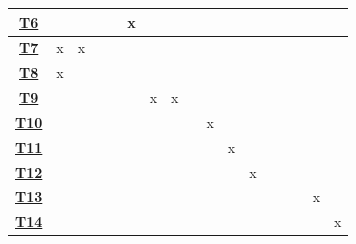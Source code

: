 \begin{table}[H]
\begin{tabular}{|c|c|c|c|c|c|c|c|c|c|c|c|c|c|c|c|c|}
	\hyperref[threat:T6]{\textbf{T6}}              &             &             &             &             & x           &    &    &    &    &     &     &     &     &     &     &     \\ \hline
	\hyperref[threat:T7]{\textbf{T7}}              & x           & x           &             &             &             &    &    &    &    &     &     &     &     &     &     &     \\ \hline
	\hyperref[threat:T8]{\textbf{T8}}              & x           &             &             &             &             &    &    &    &    &     &     &     &     &     &     &     \\ \hline
	\hyperref[threat:T9]{\textbf{T9}}              &             &             &             &             &             & x  & x  &    &    &     &     &     &     &     &     &     \\ \hline
	\hyperref[threat:T10]{\textbf{T10}}             &             &             &             &             &             &    &    &    & x  &     &     &     &     &     &     &     \\ \hline
	\hyperref[threat:T11]{\textbf{T11}}             &             &             &             &             &             &    &    &    &    & x   &     &     &     &     &     &     \\ \hline
	\hyperref[threat:T12]{\textbf{T12}}             &             &             &             &             &             &    &    &    &    &     & x   &     &     &     &     &     \\ \hline
	\hyperref[threat:T13]{\textbf{T13}}             &             &             &             &             &             &    &    &    &    &     &     &     &     &     & x   &     \\ \hline
	\hyperref[threat:T14]{\textbf{T14}}             &             &             &             &             &             &    &    &    &    &     &     &     &     &     &     & x   \\ \hline
	\end{tabular}
	\end{table}

